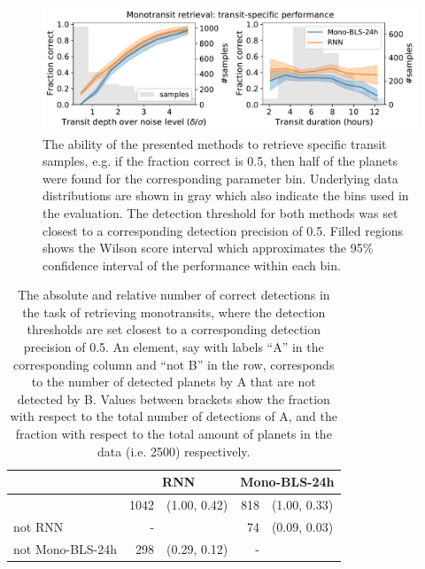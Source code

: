 \begin{figure}
    \centering
    \includegraphics[width=0.7\linewidth]{Experiments/Figures/Monos/mono_transit_specific.pdf}
    \caption{The ability of the presented methods to retrieve specific transit samples, e.g. if the fraction correct is 0.5, then half of the planets were found for the corresponding parameter bin. Underlying data distributions are shown in gray which also indicate the bins used in the evaluation. The detection threshold for both methods was set closest to a corresponding detection precision of 0.5. Filled regions shows the Wilson score interval \citep{wilson1927probable} which approximates the 95\% confidence interval of the performance within each bin.}
    \label{fig:mono_transits}
\end{figure}

\begin{table}[]
\label{tab:mono_AnotB}
\centering
\begin{tabular}{@{}lrlrl@{}}
\toprule
                 & \multicolumn{2}{c}{RNN} & \multicolumn{2}{c}{Mono-BLS-24h} \\ \midrule
                 & 1042   & (1.00, 0.42)   & 818        & (1.00, 0.33)        \\
not RNN          & -      &                & 74         & (0.09, 0.03)        \\
not Mono-BLS-24h & 298    & (0.29, 0.12)   & -          &                     \\ \bottomrule
\end{tabular}
\caption{The absolute and relative number of correct detections in the task of retrieving monotransits, where the detection thresholds are set closest to a corresponding detection precision of 0.5. An element, say with labels ``A'' in the corresponding column and ``not B'' in the row, corresponds to the number of detected planets by A that are not detected by B. Values between brackets show the fraction with respect to the total number of detections of A, and the fraction with respect to the total amount of planets in the data (i.e. 2500) respectively.}
\end{table}